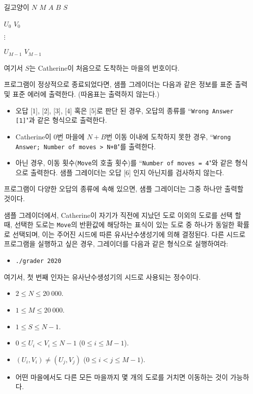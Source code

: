 \begin{problem}{길고양이}
	$N$ $M$ $A$ $B$ $S$
	
	$U_0$ $V_0$ 
	
	$\vdots$
	
	$U_{M-1}$ $V_{M-1}$
	
	여기서 $S$는 Catherine이 처음으로 도착하는 마을의 번호이다.
		
	\OutputFile
	
	프로그램이 정상적으로 종료되었다면, 샘플 그레이더는 다음과 같은 정보를 표준 출력 및 표준 에러에 출력한다. (따옴표는 출력하지 않는다.)
	
	\begin{itemize}
		\item 오답 [1], [2], [3], [4] 혹은 [5]로 판단 된 경우, 오답의 종류를 ``\texttt{Wrong Answer [1]}"과 같은 형식으로 출력한다.
		\item Catherine이 $0$번 마을에 $N+B$번 이동 이내에 도착하지 못한 경우, ``\texttt{Wrong Answer; Number of moves > N+B}"를 출력한다.
		\item 아닌 경우, 이동 횟수(\texttt{Move}의 호출 횟수)를 ``\texttt{Number of moves = 4}"와 같은 형식으로 출력한다. 샘플 그레이더는 오답 [6] 인지 아닌지를 검사하지 않는다.
	\end{itemize}
	
	프로그램이 다양한 오답의 종류에 속해 있으면, 샘플 그레이더는 그중 하나만 출력할 것이다.
	
	샘플 그레이더에서, Catherine이 자기가 직전에 지났던 도로 이외의 도로를 선택 할 때, 선택한 도로는  \texttt{Move}의 반환값에 해당하는 표식이 있는 도로 중 하나가 동일한 확률로 선택되며, 이는 주어진 시드에 따른 유사난수생성기에 의해 결정된다. 다른 시드로 프로그램을 실행하고 싶은 경우, 그레이더를 다음과 같은 형식으로 실행하여라:
	
	\begin{itemize}
		\item[] \texttt{./grader 2020}
	\end{itemize}

	여기서, 첫 번째 인자는 유사난수생성기의 시드로 사용되는 정수이다.
	
	\Constraints
	
	\begin{itemize}
		\item $2 \le N \le 20\ 000$.
		\item $1 \le M \le 20\ 000$.
		\item $1 \le S \le N-1$.
		\item $0 \le U_i < V_i \le N-1$ ($0 \le i \le M-1$).
		\item $(U_i, V_i) \ne (U_j, V_j)$ ($0 \le i < j \le M-1$).
		\item 어떤 마을에서도 다른 모든 마을까지 몇 개의 도로를 거치면 이동하는 것이 가능하다.
	\end{itemize}
	

\end{problem}
